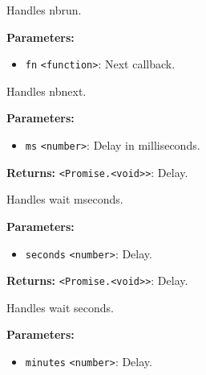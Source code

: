 \documentclass[12pt,a4paper]{article}
\begin{document}
\noindent Handles nbrun.

\vspace{5mm}
\noindent {}


\noindent \textbf{Parameters:}
\begin{itemize}
  \item \texttt{fn} \texttt{<function>}: Next callback.
\end{itemize}

\noindent Handles nbnext.

\vspace{5mm}
\noindent {}


\noindent \textbf{Parameters:}
\begin{itemize}
  \item \texttt{ms} \texttt{<number>}: Delay in milliseconds.
\end{itemize}

\noindent \textbf{Returns:} \texttt{<Promise.<void>>}: Delay.

\noindent Handles wait mseconds.

\vspace{5mm}
\noindent {}


\noindent \textbf{Parameters:}
\begin{itemize}
  \item \texttt{seconds} \texttt{<number>}: Delay.
\end{itemize}

\noindent \textbf{Returns:} \texttt{<Promise.<void>>}: Delay.

\noindent Handles wait seconds.

\vspace{5mm}
\noindent {}


\noindent \textbf{Parameters:}
\begin{itemize}
  \item \texttt{minutes} \texttt{<number>}: Delay.
\end{itemize}
\end{document}
